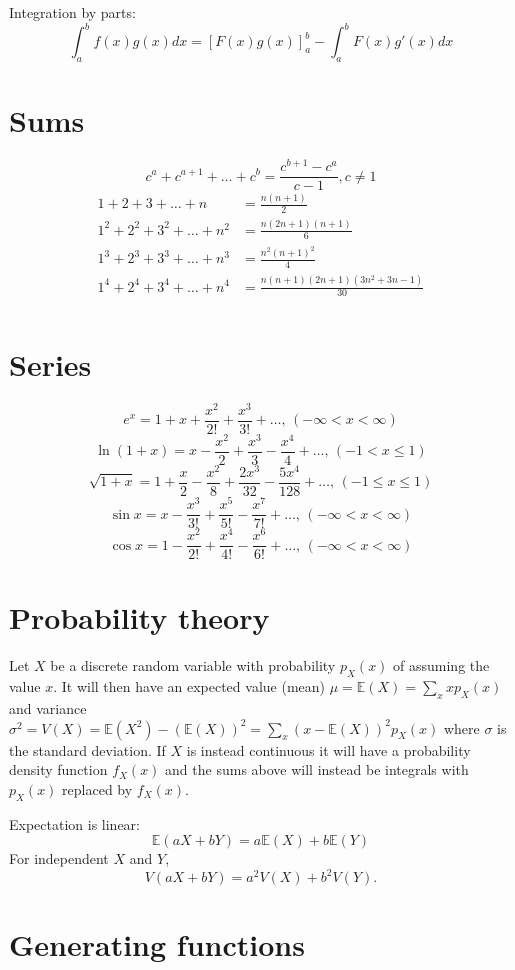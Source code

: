 Integration by parts:
\[\int_a^bf(x)g(x)dx = [F(x)g(x)]_a^b-\int_a^bF(x)g'(x)dx\]

\section{Sums}
\[ c^a + c^{a+1} + \dots + c^{b} = \frac{c^{b+1} - c^a}{c-1}, c \neq 1 \]
\begin{align*}
	1 + 2 + 3 + \dots + n &= \frac{n(n+1)}{2} \\
	1^2 + 2^2 + 3^2 + \dots + n^2 &= \frac{n(2n+1)(n+1)}{6} \\
	1^3 + 2^3 + 3^3 + \dots + n^3 &= \frac{n^2(n+1)^2}{4} \\
	1^4 + 2^4 + 3^4 + \dots + n^4 &= \frac{n(n+1)(2n+1)(3n^2 + 3n - 1)}{30} \\
\end{align*}

\section{Series}
$$e^x = 1+x+\frac{x^2}{2!}+\frac{x^3}{3!}+\dots,\,(-\infty<x<\infty)$$
$$\ln(1+x) = x-\frac{x^2}{2}+\frac{x^3}{3}-\frac{x^4}{4}+\dots,\,(-1<x\leq1)$$
$$\sqrt{1+x} = 1+\frac{x}{2}-\frac{x^2}{8}+\frac{2x^3}{32}-\frac{5x^4}{128}+\dots,\,(-1\leq x\leq1)$$
$$\sin x = x-\frac{x^3}{3!}+\frac{x^5}{5!}-\frac{x^7}{7!}+\dots,\,(-\infty<x<\infty)$$
$$\cos x = 1-\frac{x^2}{2!}+\frac{x^4}{4!}-\frac{x^6}{6!}+\dots,\,(-\infty<x<\infty)$$

\section{Probability theory}
Let $X$ be a discrete random variable with probability $p_X(x)$ of assuming the value $x$. It will then have an expected value (mean) $\mu=\mathbb{E}(X)=\sum_xxp_X(x)$ and variance $\sigma^2=V(X)=\mathbb{E}(X^2)-(\mathbb{E}(X))^2=\sum_x(x-\mathbb{E}(X))^2p_X(x)$ where $\sigma$ is the standard deviation. If $X$ is instead continuous it will have a probability density function $f_X(x)$ and the sums above will instead be integrals with $p_X(x)$ replaced by $f_X(x)$.

Expectation is linear:
\[\mathbb{E}(aX+bY) = a\mathbb{E}(X)+b\mathbb{E}(Y)\]
For independent $X$ and $Y$, \[V(aX+bY) = a^2V(X)+b^2V(Y).\]

\section{Generating functions}


